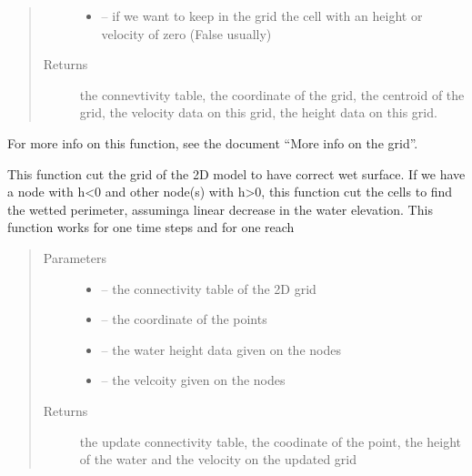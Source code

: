 \documentclass[letterpaper,10pt,english]{sphinxmanual}
\begin{document}
\begin{fulllineitems}
\begin{quote}
\begin{description}
\begin{itemize}
\item {} 
 -- if we want to keep in the grid the cell with an height or velocity of zero (False usually)

\end{itemize}

\item[{Returns}] \leavevmode
the connevtivity table, the coordinate of the grid, the centroid of the grid, the velocity data on this
grid, the height data on this grid.

\end{description}\end{quote}

For more info on this function, see the document ``More info on the grid''.

\end{fulllineitems}


\begin{fulllineitems}
\label{\detokenize{index:src.manage_grid_8.cut_2d_grid}}
This function cut the grid of the 2D model to have correct wet surface. If we have a node with h\textless{}0 and other node(s)
with h\textgreater{}0, this function cut the cells to find the wetted perimeter, assuminga linear decrease in the water elevation.
This function works for one time steps and for one reach
\begin{quote}\begin{description}
\item[{Parameters}] \leavevmode\begin{itemize}
\item {} 
 -- the connectivity table of the 2D grid

\item {} 
 -- the coordinate of the points

\item {} 
 -- the water height data given on the nodes

\item {} 
 -- the velcoity given on the nodes

\end{itemize}

\item[{Returns}] \leavevmode
the update connectivity table, the coodinate of the point, the height of the water and the velocity on the updated grid

\end{description}\end{quote}

\end{fulllineitems}
\end{document}
